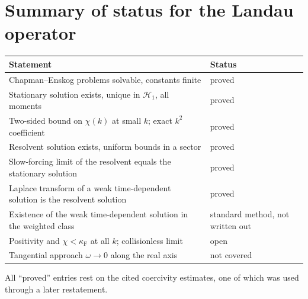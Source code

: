 \documentclass[11pt]{article}
\newcommand{\cH}{\mathcal{H}}
\theoremstyle{remark}
\begin{document}
\section{Summary of status for the Landau operator}

\begin{center}
\renewcommand{\arraystretch}{1.3}
\begin{tabular}{p{8.2cm}p{6.2cm}}
  Statement & Status \\ \hline
  Chapman--Enskog problems solvable, constants finite & proved \\
  Stationary solution exists, unique in $\cH_1$, all moments & proved \\
  Two-sided bound on $\chi(k)$ at small $k$; exact $k^2$ coefficient & proved \\
  Resolvent solution exists, uniform bounds in a sector & proved \\
  Slow-forcing limit of the resolvent equals the stationary solution & proved \\
  Laplace transform of a weak time-dependent solution is the resolvent solution & proved \\
  Existence of the weak time-dependent solution in the weighted class & standard method, not written out \\
  Positivity and $\chi<\kappa_{\mathrm F}$ at all $k$; collisionless limit & open \\
  Tangential approach $\omega\to0$ along the real axis & not covered \\
\end{tabular}
\end{center}
All ``proved'' entries rest on the cited coercivity estimates, one of which
was used through a later restatement.
\end{document}
